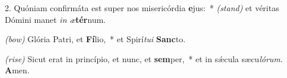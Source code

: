 2. Quóniam confirmáta est super nos misericórdia \textbf{e}jus:~* {\color{red}\textit{(stand)}}
	et véritas Dómini manet \textit{in} \textit{æ}\textbf{tér}num.

{\color{red}\textit{(bow)}} Glória Patri, et \textbf{Fí}lio,~*
	et Spirí\textit{tu}\textit{i} \textbf{Sanc}to.

{\color{red}\textit{(rise)}} Sicut erat in princípio, et nunc, et \textbf{sem}per,~*
	et in s\'{\ae}cula sæcu\textit{ló}\textit{rum}. \textbf{A}men.